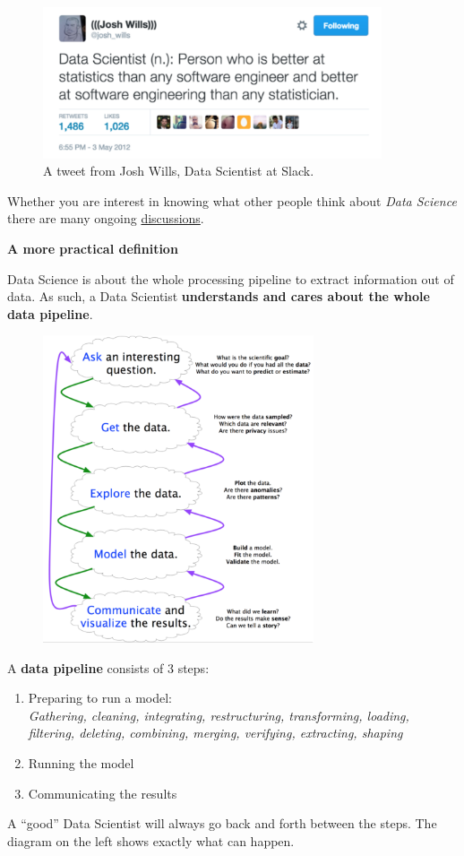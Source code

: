 \begin{figure}[H]
 \centering
 \includegraphics[width=10cm]{./img/01/tweet_wills.png}
 \caption{\label{img:tweet_wills} A tweet from Josh Wills, Data Scientist at Slack.}
\end{figure}

Whether you are interest in knowing what other people think about \emph{Data Science} there are many ongoing \href{https://www.quora.com/What-is-data-science}{discussions}.

{\bf A more practical definition} 

Data Science is about the whole processing pipeline to extract information out of data. As such, a Data Scientist {\bf understands and cares about the whole data pipeline}.

\begin{minipage}{0.5\textwidth}
\begin{figure}[H]
 \centering
 \includegraphics[width=8cm]{./img/01/pipeline.png}
\end{figure}
\end{minipage} \hfill
\begin{minipage}{0.45\textwidth}
A {\bf data pipeline} consists of 3 steps:
\begin{enumerate}
 \item Preparing to run a model: \\
  {\it Gathering, cleaning, integrating, restructuring, transforming, loading, filtering, deleting, combining, merging, verifying, extracting, shaping}
 \item Running the model
 \item Communicating the results
\end{enumerate}
\vspace{0.5cm}
 A ``good'' Data Scientist will always go back and forth between the steps. The diagram on the left shows exactly what can happen. 
\end{minipage}
